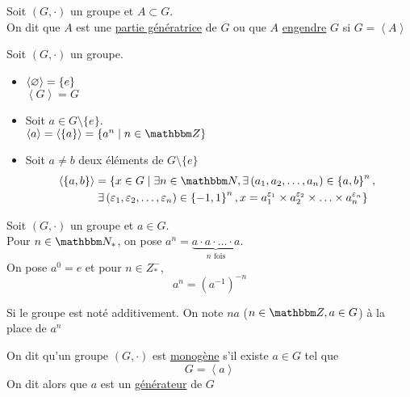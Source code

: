 \begin{defn}
	Soit $(G, \cdot)$ un groupe et $A \subset G$.\\
	On dit que $A$ est une \underline{partie génératrice} de $G$ ou que $A$ \underline{engendre} $G$ si $G = \left<A\right>$
\end{defn}

\begin{exm}
\end{exm}

\begin{exm}
	Soit $(G, \cdot)$ un groupe.\\
	\begin{itemize}
		\item $\left<\varnothing\right> = \{e\}$\\ $\left<G\right> = G$
		\item Soit $a \in G\setminus \{e\}$.\\
			$\left<a\right> = \left< \{a\} \right> = \{a^n  \mid n \in \Z\} $ 
		\item Soit $a \neq b$ deux éléments de $G \setminus \{e\}$\\
			\begin{align*}
				\left<\{a,b\}\right> &= 
				\left\{x \in G \mid 
				\exists n \in \N, 
				\exists \left( a_1,a_2,\ldots,a_n \right) \in \left\{ a,b \right\} ^n,\right.\\
				&\left.\exists \left( \varepsilon_1,\varepsilon_2, \ldots, \varepsilon_n \right) \in \left\{ -1,1 \right\}^n, 
				x = a_1^{\varepsilon_1}\times a_2^{\varepsilon_2}\times  \ldots \times a_n^{\varepsilon_n} 
			\right\}
		\end{align*}
	\end{itemize}
\end{exm}

\begin{rmk}[Notation]
	Soit $(G, \cdot)$ un groupe et $a \in G$.\\
	Pour $n \in \N_*$, on pose $a^n = \underbrace{a \cdot a \cdot \ldots \cdot a}_\text{$n$ fois}$.\\
	On pose $a^0=e$ et pour $n \in Z_*^-$, \[
	a^n = \left( a^{-1} \right) ^{-n}
	\] 
\end{rmk}

\begin{rmk}
	Si le groupe est noté additivement. On note $na$ ($n\in \Z, a \in G$) à la place de $a^n$
\end{rmk}

\begin{defn}
	On dit qu'un groupe $(G, \cdot)$ est \underline{monogène} s'il existe $a \in G$ tel que \[
	G = \left<a \right>
	\] 
	On dit alors que $a$ est un \underline{générateur} de $G$
\end{defn}

